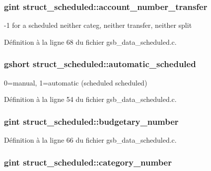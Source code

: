 \subsubsection[{account\_\-number\_\-transfer}]{\setlength{\rightskip}{0pt plus 5cm}gint {\bf struct\_\-scheduled::account\_\-number\_\-transfer}}\label{structstruct__scheduled_a20b2a9dcd15dfd546aadea0027e99b2c}
-\/1 for a scheduled neither categ, neither transfer, neither split 

Définition à la ligne 68 du fichier gsb\_\-data\_\-scheduled.c.

\subsubsection[{automatic\_\-scheduled}]{\setlength{\rightskip}{0pt plus 5cm}gshort {\bf struct\_\-scheduled::automatic\_\-scheduled}}\label{structstruct__scheduled_a36056f3142c09e30d5f93a585d738bcc}
0=manual, 1=automatic (scheduled scheduled) 

Définition à la ligne 54 du fichier gsb\_\-data\_\-scheduled.c.

\subsubsection[{budgetary\_\-number}]{\setlength{\rightskip}{0pt plus 5cm}gint {\bf struct\_\-scheduled::budgetary\_\-number}}\label{structstruct__scheduled_afbcfc3ca01aa294a6b7d2980a1aa18a6}


Définition à la ligne 66 du fichier gsb\_\-data\_\-scheduled.c.

\subsubsection[{category\_\-number}]{\setlength{\rightskip}{0pt plus 5cm}gint {\bf struct\_\-scheduled::category\_\-number}}\label{structstruct__scheduled_ad7f4ad17ecccb64d0bdf3255d2c1aaef}


